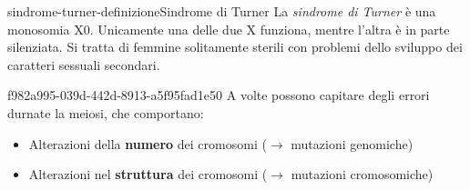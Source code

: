 \documentclass[preview]{standalone}
\begin{document}
\begin{snippetdefinition}{sindrome-turner-definizione}{Sindrome di Turner}
    La \textit{sindrome di Turner} è
    una monosomia X0. Unicamente una delle due X funziona,
    mentre l'altra è in parte silenziata. Si tratta di femmine
    solitamente sterili con problemi dello sviluppo dei caratteri sessuali secondari.
\end{snippetdefinition}

\begin{snippet}{f982a995-039d-442d-8913-a5f95fad1e50}
    A volte possono capitare degli errori durnate la meiosi, che comportano:
    \begin{itemize}
        \item Alterazioni della \textbf{numero} dei cromosomi (\(\rightarrow\) mutazioni genomiche)
        \item Alterazioni nel \textbf{struttura} dei cromosomi (\(\rightarrow\) mutazioni cromosomiche)
    \end{itemize}
\end{snippet}
\end{document}
